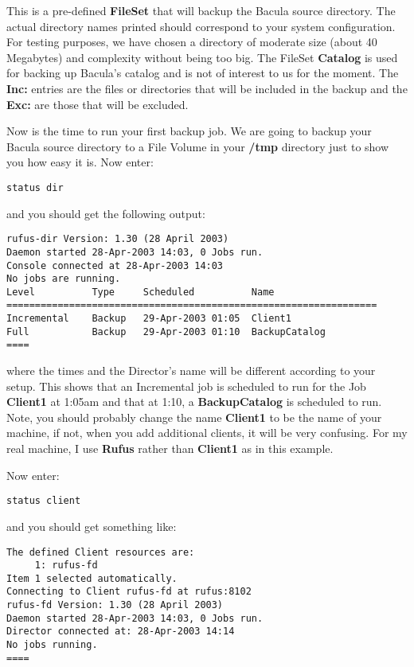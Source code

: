 {{This is a pre-defined {\bf FileSet} that will backup the Bacula source
directory. The actual directory names printed should correspond to your system
configuration. For testing purposes, we have chosen a directory of moderate
size (about 40 Megabytes) and complexity without being too big. The FileSet
{\bf Catalog} is used for backing up Bacula's catalog and is not of interest
to us for the moment. The {\bf Inc:} entries are the files or directories that
will be included in the backup and the {\bf Exc:} are those that will be
excluded. 

Now is the time to run your first backup job. We are going to backup your
Bacula source directory to a File Volume in your {\bf /tmp} directory just to
show you how easy it is. Now enter: 

\footnotesize
\begin{verbatim}
status dir
\end{verbatim}
\normalsize

and you should get the following output: 

\footnotesize
\begin{verbatim}
rufus-dir Version: 1.30 (28 April 2003)
Daemon started 28-Apr-2003 14:03, 0 Jobs run.
Console connected at 28-Apr-2003 14:03
No jobs are running.
Level          Type     Scheduled          Name
=================================================================
Incremental    Backup   29-Apr-2003 01:05  Client1
Full           Backup   29-Apr-2003 01:10  BackupCatalog
====
\end{verbatim}
\normalsize

where the times and the Director's name will be different according to your
setup. This shows that an Incremental job is scheduled to run for the Job {\bf
Client1} at 1:05am and that at 1:10, a {\bf BackupCatalog} is scheduled to
run. Note, you should probably change the name {\bf Client1} to be the name of
your machine, if not, when you add additional clients, it will be very
confusing. For my real machine, I use {\bf Rufus} rather than {\bf Client1} as
in this example. 

Now enter: 

\footnotesize
\begin{verbatim}
status client
\end{verbatim}
\normalsize

and you should get something like: 

\footnotesize
\begin{verbatim}
The defined Client resources are:
     1: rufus-fd
Item 1 selected automatically.
Connecting to Client rufus-fd at rufus:8102
rufus-fd Version: 1.30 (28 April 2003)
Daemon started 28-Apr-2003 14:03, 0 Jobs run.
Director connected at: 28-Apr-2003 14:14
No jobs running.
====
\end{verbatim}
\normalsize

}}
